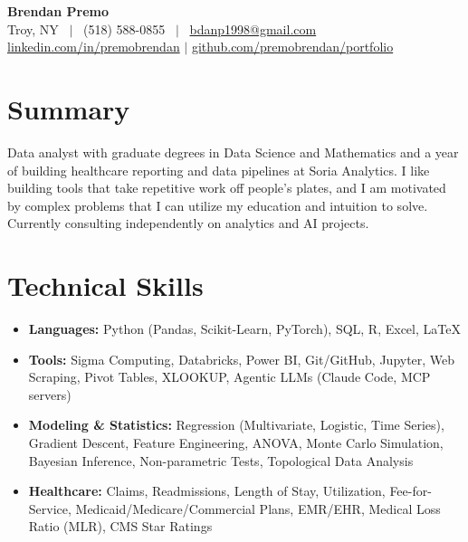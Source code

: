 \documentclass[10pt,letterpaper]{article}
\begin{document}
\begin{center}
    {\Huge \textbf{Brendan Premo}} \\ \vspace{4pt}
    Troy, NY \ $|$ \ (518) 588-0855 \ $|$ \ \href{mailto:bdanp1998@gmail.com}{bdanp1998@gmail.com} \\
    \href{https://www.linkedin.com/in/premobrendan/}{linkedin.com/in/premobrendan} $|$ 
    \href{https://github.com/premobrendan/portfolio}{github.com/premobrendan/portfolio}
\end{center}

\section*{Summary}
\noindent Data analyst with graduate degrees in Data Science and Mathematics and a year of building healthcare
reporting and data pipelines at Soria Analytics. I like building tools that take repetitive work off people's plates,
and I am motivated by complex problems that I can utilize my education and intuition to solve. Currently consulting 
independently on analytics and AI projects.

\section*{Technical Skills}
\begin{itemize}[noitemsep, topsep=0pt]
    \item \textbf{Languages:} Python (Pandas, Scikit-Learn, PyTorch), SQL, R, Excel, \LaTeX
    \item \textbf{Tools:} Sigma Computing, Databricks, Power BI, Git/GitHub, Jupyter, Web Scraping, Pivot Tables, XLOOKUP, Agentic LLMs (Claude Code, MCP servers)
    \item \textbf{Modeling \& Statistics:} Regression (Multivariate, Logistic, Time Series), Gradient Descent, Feature Engineering, ANOVA, Monte Carlo Simulation, Bayesian Inference, Non-parametric Tests, Topological Data Analysis
    \item \textbf{Healthcare:} Claims, Readmissions, Length of Stay, Utilization, Fee-for-Service, Medicaid/Medicare/Commercial Plans, EMR/EHR, Medical Loss Ratio (MLR), CMS Star Ratings
\end{itemize}
\end{document}
